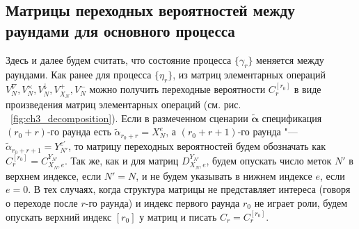 \subsection{Матрицы переходных вероятностей между раундами для основного процесса}
Здесь и далее будем считать, что состояние процесса $\{ \gamma_r \}$ меняется между раундами. Как ранее для процесса $\{ \eta_r \}$, из матриц элементарных операций $V_N^\nabla, V_N^\times, V_N^\downarrow, V_{X_N}^+, V_N^-$ можно получить переходные вероятности $C_r^{[r_0]}$ в виде произведения матриц элементарных операций (см. рис. ~\ref{fig:ch3_decomposition}). Если в размеченном сценарии $\widetilde{\bm{\alpha}}$ спецификация $(r_0 + r)$-го раунда есть $\widetilde{\alpha}_{r_0 + r} = X_{N}^e$, а $(r_0+r+1)$-го раунда "--- $\widetilde{\alpha}_{r_0+r+1} = Y_{N'}^{e'}$, то матрицу переходных вероятностей будем обозначать как $C_r^{[r_0]} = C_{X_N,e}^{Y_{N'}}$. Так же, как и для матриц $D_{X_{N},e}^{Y_{N'}}$, будем опускать число меток $N'$ в верхнем индексе, если $N' = N$, и не будем указывать в нижнем индексе $e$, если $e = 0$. В тех случаях, когда структура матрицы не представляет интереса (говоря о переходе после $r$-го раунда) и индекс первого раунда $r_0$ не играет роли, будем опускать верхний индекс $[r_0]$ у матриц и писать $C_r = C_r^{[r_0]}$.

